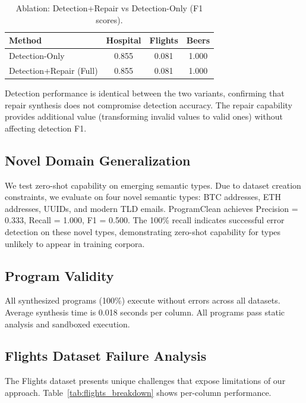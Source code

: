 \documentclass{article}
\begin{document}
\begin{table}[h]
\caption{Ablation: Detection+Repair vs Detection-Only (F1 scores).}
\label{tab:ablation_repair}
\centering
\small
\begin{tabular}{lccc}
\toprule
Method & Hospital & Flights & Beers \\
\midrule
Detection-Only & 0.855 & 0.081 & 1.000 \\
Detection+Repair (Full) & 0.855 & 0.081 & 1.000 \\
\bottomrule
\end{tabular}
\end{table}

Detection performance is identical between the two variants, confirming that repair synthesis does not compromise detection accuracy. The repair capability provides additional value (transforming invalid values to valid ones) without affecting detection F1.

\subsection{Novel Domain Generalization}
\label{sec:novel}

We test zero-shot capability on emerging semantic types. Due to dataset creation constraints, we evaluate on four novel semantic types: BTC addresses, ETH addresses, UUIDs, and modern TLD emails. ProgramClean achieves Precision = 0.333, Recall = 1.000, F1 = 0.500. The 100\% recall indicates successful error detection on these novel types, demonstrating zero-shot capability for types unlikely to appear in training corpora.

\subsection{Program Validity}

All synthesized programs (100\%) execute without errors across all datasets. Average synthesis time is 0.018 seconds per column. All programs pass static analysis and sandboxed execution.

\subsection{Flights Dataset Failure Analysis}
\label{sec:flights_analysis}

The Flights dataset presents unique challenges that expose limitations of our approach. Table~\ref{tab:flights_breakdown} shows per-column performance.
\end{document}
